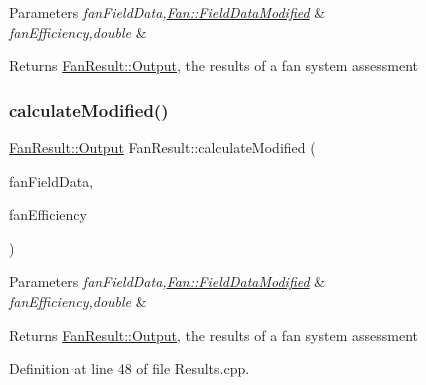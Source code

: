 \begin{DoxyParams}{Parameters}
{\em fan\+Field\+Data,\hyperlink{struct_fan_1_1_field_data_modified}{Fan\+::\+Field\+Data\+Modified}} & \\
\hline
{\em fan\+Efficiency,double} & \\
\hline
\end{DoxyParams}
\begin{DoxyReturn}{Returns}
\hyperlink{struct_fan_result_1_1_output}{Fan\+Result\+::\+Output}, the results of a fan system assessment 
\end{DoxyReturn}
\mbox{\label{class_fan_result_ac8b8ab301fca8ce4d37e6d4fbd44b9b9}} 
\subsubsection{\texorpdfstring{calculate\+Modified()}{calculateModified()}\hspace{0.1cm}{\footnotesize\ttfamily [2/3]}}
{\footnotesize\ttfamily \hyperlink{struct_fan_result_1_1_output}{Fan\+Result\+::\+Output} Fan\+Result\+::calculate\+Modified (\begin{DoxyParamCaption}\item[{\hyperlink{struct_fan_1_1_field_data_modified}{Fan\+::\+Field\+Data\+Modified} const \&}]{fan\+Field\+Data,  }\item[{double}]{fan\+Efficiency }\end{DoxyParamCaption})}


\begin{DoxyParams}{Parameters}
{\em fan\+Field\+Data,\hyperlink{struct_fan_1_1_field_data_modified}{Fan\+::\+Field\+Data\+Modified}} & \\
\hline
{\em fan\+Efficiency,double} & \\
\hline
\end{DoxyParams}
\begin{DoxyReturn}{Returns}
\hyperlink{struct_fan_result_1_1_output}{Fan\+Result\+::\+Output}, the results of a fan system assessment 
\end{DoxyReturn}


Definition at line 48 of file Results.\+cpp.

\mbox{\label{class_fan_result_a64173c80c723487b8a555250d22be459}} 
